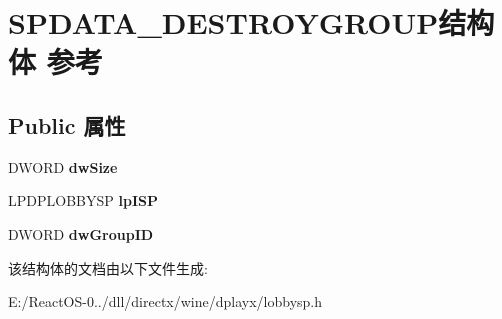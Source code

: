 \hypertarget{struct_s_p_d_a_t_a___d_e_s_t_r_o_y_g_r_o_u_p}{}\section{S\+P\+D\+A\+T\+A\+\_\+\+D\+E\+S\+T\+R\+O\+Y\+G\+R\+O\+U\+P结构体 参考}
\label{struct_s_p_d_a_t_a___d_e_s_t_r_o_y_g_r_o_u_p}
\subsection*{Public 属性}
\begin{DoxyCompactItemize}
\item 
\mbox{\label{struct_s_p_d_a_t_a___d_e_s_t_r_o_y_g_r_o_u_p_afe1b0922689b80da27811c6fe878b093}} 
D\+W\+O\+RD {\bfseries dw\+Size}
\item 
\mbox{\label{struct_s_p_d_a_t_a___d_e_s_t_r_o_y_g_r_o_u_p_a0c65f72408acd394032f90ad26a52712}} 
L\+P\+D\+P\+L\+O\+B\+B\+Y\+SP {\bfseries lp\+I\+SP}
\item 
\mbox{\label{struct_s_p_d_a_t_a___d_e_s_t_r_o_y_g_r_o_u_p_abe0b747d8b11384996496e43b9d6471d}} 
D\+W\+O\+RD {\bfseries dw\+Group\+ID}
\end{DoxyCompactItemize}


该结构体的文档由以下文件生成\+:\begin{DoxyCompactItemize}
\item 
E\+:/\+React\+O\+S-\/0../dll/directx/wine/dplayx/lobbysp.\+h\end{DoxyCompactItemize}
